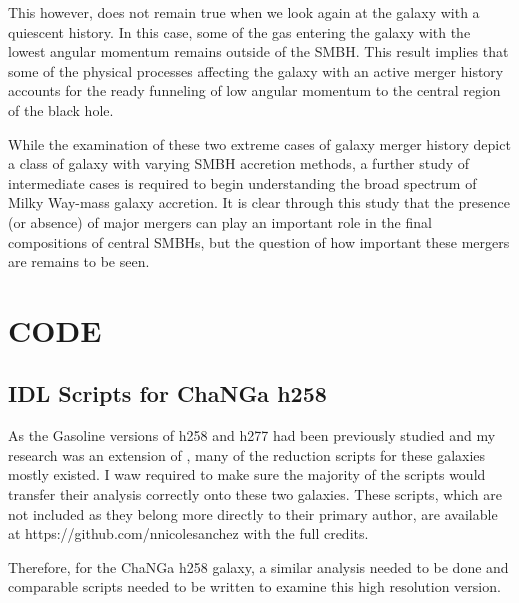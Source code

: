 \documentclass[12pt,headA,chapB]{fiskthesis}
\begin{document}
This however, does not remain true when we look again at the galaxy with a quiescent history. In this case, some of the gas entering the galaxy with the lowest angular momentum remains outside of the SMBH. This result implies that some of the physical processes affecting the galaxy with an active merger history accounts for the ready funneling of low angular momentum to the central region of the black hole. 

While the examination of these two extreme cases of galaxy merger history depict a class of galaxy with varying SMBH accretion methods, a further study of intermediate cases is required to begin understanding the broad spectrum of Milky Way-mass galaxy accretion. It is clear through this study that the presence (or absence) of major mergers can play an important role in the final compositions of central SMBHs, but the question of how important these mergers are remains to be seen.



\backmatter
\chapter{CODE}
\section{IDL Scripts for ChaNGa h258}
As the Gasoline versions of h258 and h277 had been previously studied and my research was an extension of \cite{Bellovary2013}, many of the reduction scripts for these galaxies mostly existed. I waw required to make sure the majority of the scripts would transfer their analysis correctly onto these two galaxies. These scripts, which are not included as they belong more directly to their primary author, are available at https://github.com/nnicolesanchez with the full credits.

Therefore, for the ChaNGa h258 galaxy, a similar analysis needed to be done and comparable scripts needed to be written to examine this high resolution version.
\end{document}
